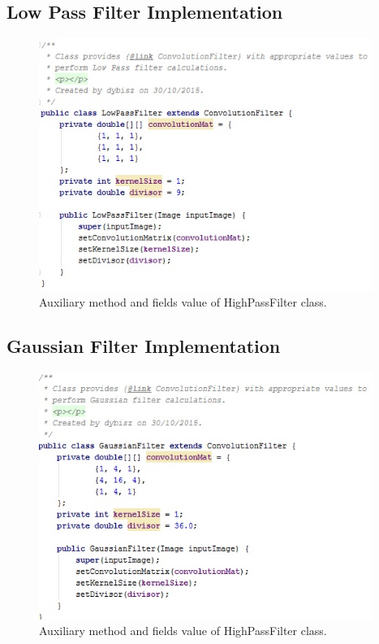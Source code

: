 \documentclass{article}
\begin{document}
%
%
\subsection{Low Pass Filter Implementation}
\begin{figure}[H]
	\centering
	\includegraphics[width=0.97\textwidth]{_Figures/lowpass_class.jpg}
    \caption{Auxiliary method and fields value of HighPassFilter class.}
    \label{fig:code:treshold_func}
\end{figure}

%
%
\subsection{Gaussian Filter Implementation}
\begin{figure}[H]
	\centering
	\includegraphics[width=0.97\textwidth]{_Figures/gaussian_class.jpg}
    \caption{Auxiliary method and fields value of HighPassFilter class.}
    \label{fig:code:treshold_func}
\end{figure}
\end{document}
